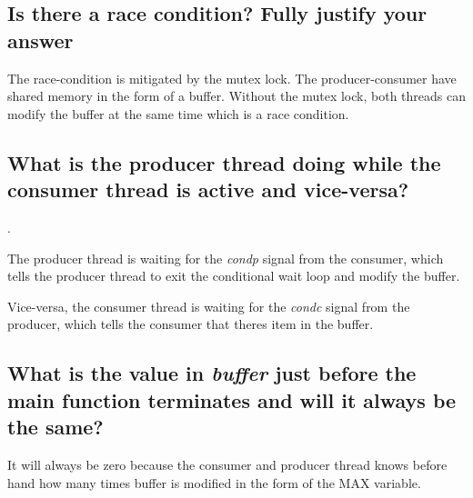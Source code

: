 \subsection{Is there a race condition? Fully justify your answer}

The race-condition is mitigated by the mutex lock. The producer-consumer have shared memory in the form
of a buffer. Without the mutex lock, both threads can modify the buffer at the same time which is a race
condition.

\subsection{What is the producer thread doing while the consumer thread is active and vice-versa?}.

The producer thread is waiting for the \emph{condp} signal from the consumer, which tells the producer 
thread to exit the conditional wait loop and modify the buffer.

Vice-versa, the consumer thread is waiting for the \emph{condc} signal from the producer, which tells
the consumer that theres item in the buffer.

\subsection{What is the value in \emph{buffer} just before the main function terminates and will it always be the same?}

It will always be zero because the consumer and producer thread knows before hand how many times buffer is 
modified in the form of the MAX variable.





